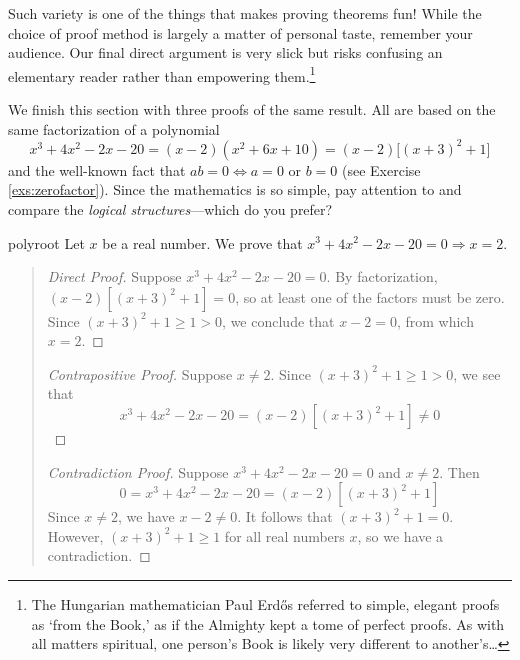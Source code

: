 Such variety is one of the things that makes proving theorems fun! While the choice of proof method is largely a matter of personal taste, remember your audience. Our final direct argument is very slick but risks confusing an elementary reader rather than empowering them.\footnote{The Hungarian mathematician Paul Erdős referred to simple, elegant proofs as `from the Book,' as if the  Almighty kept a tome of perfect proofs. As with all matters spiritual, one person's Book is likely very different to another's\ldots} 




We finish this section with three proofs of the same result. All are based on the same factorization of a polynomial
\[
	x^3+4x^2-2x-20=(x-2)(x^2+6x+10)=(x-2)\bigl[(x+3)^2+1\bigr]
\]
and the well-known fact that $ab=0\iff a=0$ or $b=0$ (see Exercise \ref{exs:zerofactor}). Since the mathematics is so simple, pay attention to and compare the \emph{logical structures}---which do you prefer?

\begin{example}{}{polyroot}
	Let $x$ be a real number. We prove that $x^3+4x^2-2x-20=0\Longrightarrow x=2$.
	\begin{quote}
		\begin{proof}[Direct Proof]
			Suppose $x^3+4x^2-2x-20=0$. By factorization, $(x-2)[(x+3)^2+1]=0$, so at least one of the factors must be zero. Since $(x+3)^2+1\ge 1>0$, we conclude that $x-2=0$, from which $x=2$.
		\end{proof}
	
		\begin{proof}[Contrapositive Proof]
		Suppose $x\neq 2$. Since $(x+3)^2+1\ge 1>0$, we see that
			\[
				x^3+4x^2-2x-20=(x-2)[(x+3)^2+1]\neq 0 \tag*{\qedhere}
			\]
		\end{proof}
	
		\begin{proof}[Contradiction Proof]
			Suppose $x^3+4x^2-2x-20=0$ and $x\neq 2$. Then
			\[
				0=x^3+4x^2-2x-20=(x-2)[(x+3)^2+1]
			\]
			Since $x\neq 2$, we have $x-2\neq 0$. It follows that $(x+3)^2+1=0$. However, $(x+3)^2+1\ge 1$ for all real numbers $x$, so we have a contradiction.
		\end{proof}
	\end{quote}
\end{example}



